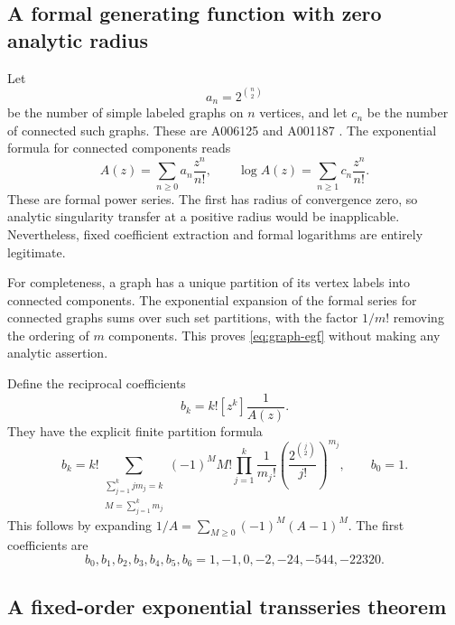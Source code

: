 \documentclass[11pt,a4paper]{article}
\numberwithin{equation}{section}
\theoremstyle{definition}
\theoremstyle{remark}
\begin{document}
\subsection{A formal generating function with zero analytic radius}

Let
\[
 a_n=2^{\binom n2}
\]
be the number of simple labeled graphs on $n$ vertices, and let $c_n$ be the number of connected such graphs. These are A006125 and A001187 \cite{oeisallgraphs,oeisconnected}. The exponential formula for connected components reads
\begin{equation}
 A(z)=\sum_{n\ge0}a_n\frac{z^n}{n!},\qquad
 \log A(z)=\sum_{n\ge1}c_n\frac{z^n}{n!}.
 \label{eq:graph-egf}
\end{equation}
These are formal power series. The first has radius of convergence zero, so analytic singularity transfer at a positive radius would be inapplicable. Nevertheless, fixed coefficient extraction and formal logarithms are entirely legitimate.

For completeness, a graph has a unique partition of its vertex labels into connected components. The exponential expansion of the formal series for connected graphs sums over such set partitions, with the factor $1/m!$ removing the ordering of $m$ components. This proves \eqref{eq:graph-egf} without making any analytic assertion.

Define the reciprocal coefficients
\begin{equation}
 b_k=k![z^k]\frac1{A(z)}.
 \label{eq:graph-b}
\end{equation}
They have the explicit finite partition formula
\begin{equation}
 b_k=k!\sum_{\substack{\sum_{j=1}^k jm_j=k\\M=\sum_{j=1}^k m_j}}
       (-1)^M M!\prod_{j=1}^k
            \frac1{m_j!}\left(\frac{2^{\binom j2}}{j!}\right)^{m_j},
 \qquad b_0=1.
 \label{eq:graph-b-finite}
\end{equation}
This follows by expanding $1/A=\sum_{M\ge0}(-1)^M(A-1)^M$. The first coefficients are
\begin{equation}
 b_0,b_1,b_2,b_3,b_4,b_5,b_6
   =1,-1,0,-2,-24,-544,-22320.
 \label{eq:graph-b-first}
\end{equation}

\subsection{A fixed-order exponential transseries theorem}
\end{document}

